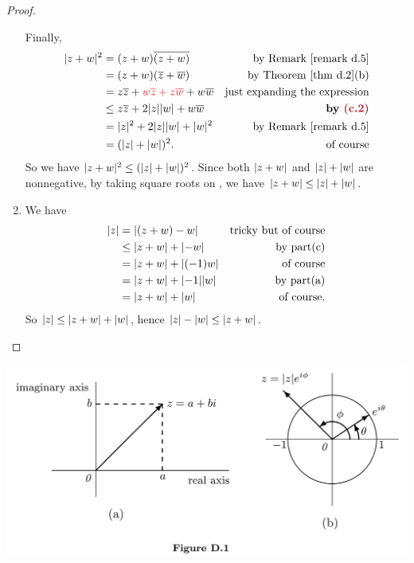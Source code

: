 \begin{proof}
\begin{enumerate}
Finally,
\begin{align*}
    \abs{z + w}^2 & = (z + w)\conjugatet{(z + w)} & \text{by \RMK{d.5}} \\
        & = (z + w)(\conjugatet{z} + \conjugatet{w}) & \text{by \THM{d.2}(b)} \\
        & = z\conjugatet{z} + \RED{w\conjugatet{z} + z\conjugatet{w}} + w\conjugatet{w} & \text{just expanding the expression} \\
        & \le z\conjugatet{z} + 2\abs{z}\abs{w} + w\conjugatet{w} & \textbf{by \MAROON{(c.2)}} \\
        & = \abs{z}^2 + 2\abs{z}\abs{w} + \abs{w}^2 & \text{by \RMK{d.5}} \\
        & = (\abs{z} + \abs{w})^2. & \text{of course}
\end{align*}
So we have \(\lvert z + w\rvert^2 \le (\lvert z\rvert + \lvert w\rvert)^2\). 
Since both \(\lvert z + w\rvert\) and \(\lvert z\rvert + \lvert w\rvert\) are nonnegative, by taking square roots on , we have \(\lvert z + w\rvert \le \lvert z\rvert + \lvert w\rvert\).

\item We have
\begin{align*}
    \lvert z\rvert & = \lvert(z + w) - w\rvert & \text{tricky but of course} \\
        & \le \lvert z + w\rvert + \lvert-w\rvert & \text{by part(c)} \\
        & = \lvert z + w\rvert + \lvert(-1)w\rvert & \text{of course} \\
        & = \lvert z + w\rvert + \lvert-1\rvert\lvert w\rvert & \text{by part(a)} \\
        & = \lvert z + w\rvert + \lvert w\rvert & \text{of course}.
\end{align*}
So \(\lvert z\rvert \le \lvert z + w\rvert + \lvert w\rvert\), hence \(\lvert z\rvert - \lvert w\rvert \le \lvert z + w\rvert\).
\end{enumerate}
\end{proof}

\includegraphics[width=14cm]{images/figure-d-1.png}

